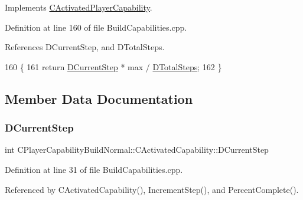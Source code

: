 Implements \hyperlink{classCActivatedPlayerCapability_a405dc6076058006a4f801727de4cfe4d}{C\+Activated\+Player\+Capability}.



Definition at line 160 of file Build\+Capabilities.\+cpp.



References D\+Current\+Step, and D\+Total\+Steps.


\begin{DoxyCode}
160                                                                             \{
161     \textcolor{keywordflow}{return} \hyperlink{classCPlayerCapabilityBuildNormal_1_1CActivatedCapability_ab6e20b5de47d912d9e38c2e8395f1ad1}{DCurrentStep} * max / \hyperlink{classCPlayerCapabilityBuildNormal_1_1CActivatedCapability_a50e3103232671fc231348e7a86c1fed5}{DTotalSteps};
162 \}
\end{DoxyCode}


\subsection{Member Data Documentation}
\hypertarget{classCPlayerCapabilityBuildNormal_1_1CActivatedCapability_ab6e20b5de47d912d9e38c2e8395f1ad1}{}\label{classCPlayerCapabilityBuildNormal_1_1CActivatedCapability_ab6e20b5de47d912d9e38c2e8395f1ad1} 
\subsubsection{\texorpdfstring{D\+Current\+Step}{DCurrentStep}}
{\footnotesize\ttfamily int C\+Player\+Capability\+Build\+Normal\+::\+C\+Activated\+Capability\+::\+D\+Current\+Step\hspace{0.3cm}{\ttfamily [protected]}}



Definition at line 31 of file Build\+Capabilities.\+cpp.



Referenced by C\+Activated\+Capability(), Increment\+Step(), and Percent\+Complete().

\hypertarget{classCPlayerCapabilityBuildNormal_1_1CActivatedCapability_a8997bc10da71f5df340096cd0d717d84}{}\label{classCPlayerCapabilityBuildNormal_1_1CActivatedCapability_a8997bc10da71f5df340096cd0d717d84} 
